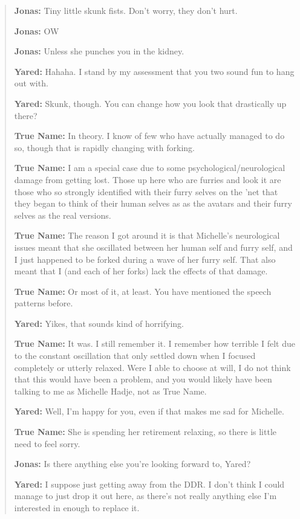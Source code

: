 \begin{quote}
\textbf{Jonas:} Tiny little skunk fists. Don't worry, they don't hurt.

\textbf{Jonas:} OW

\textbf{Jonas:} Unless she punches you in the kidney.

\textbf{Yared:} Hahaha. I stand by my assessment that you two sound fun to hang out with.

\textbf{Yared:} Skunk, though. You can change how you look that drastically up there?

\textbf{True Name:} In theory. I know of few who have actually managed to do so, though that is rapidly changing with forking.

\textbf{True Name:} I am a special case due to some psychological/neurological damage from getting lost. Those up here who are furries and look it are those who so strongly identified with their furry selves on the 'net that they began to think of their human selves as as the avatars and their furry selves as the real versions.

\textbf{True Name:} The reason I got around it is that Michelle's neurological issues meant that she oscillated between her human self and furry self, and I just happened to be forked during a wave of her furry self. That also meant that I (and each of her forks) lack the effects of that damage.

\textbf{True Name:} Or most of it, at least. You have mentioned the speech patterns before.

\textbf{Yared:} Yikes, that sounds kind of horrifying.

\textbf{True Name:} It was. I still remember it. I remember how terrible I felt due to the constant oscillation that only settled down when I focused completely or utterly relaxed. Were I able to choose at will, I do not think that this would have been a problem, and you would likely have been talking to me as Michelle Hadje, not as True Name.

\textbf{Yared:} Well, I'm happy for you, even if that makes me sad for Michelle.

\textbf{True Name:} She is spending her retirement relaxing, so there is little need to feel sorry.

\textbf{Jonas:} Is there anything else you're looking forward to, Yared?

\textbf{Yared:} I suppose just getting away from the DDR. I don't think I could manage to just drop it out here, as there's not really anything else I'm interested in enough to replace it.


\end{quote}
